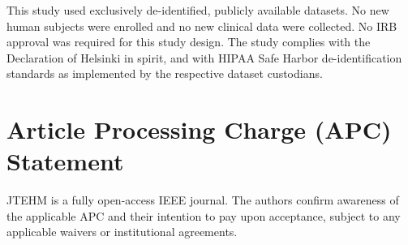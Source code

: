 \documentclass[11pt]{article}
\begin{document}
This study used exclusively de-identified, publicly available datasets. No
new human subjects were enrolled and no new clinical data were collected. No
IRB approval was required for this study design. The study complies with the
Declaration of Helsinki in spirit, and with HIPAA Safe Harbor de-identification
standards as implemented by the respective dataset custodians.

\section{Article Processing Charge (APC) Statement}

JTEHM is a fully open-access IEEE journal. The authors confirm awareness of the
applicable APC and their intention to pay upon acceptance, subject to any
applicable waivers or institutional agreements.
\end{document}
